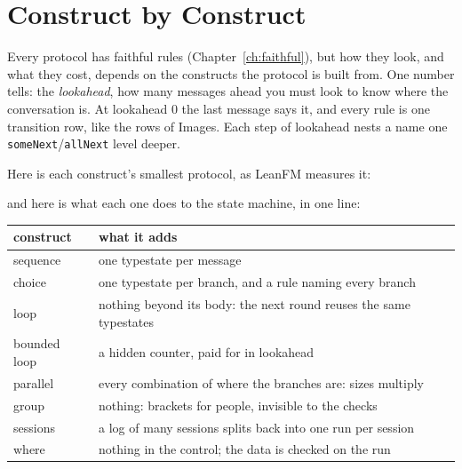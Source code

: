 \chapter{Construct by Construct}\label{ch:constructs}

Every protocol has faithful rules (Chapter~\ref{ch:faithful}), but how they look, and what
they cost, depends on the constructs the protocol is built from. One number tells: the
\emph{lookahead}, how many messages ahead you must look to know where the conversation is.
At lookahead $0$ the last message says it, and every rule is one transition row, like the
rows of Images. Each step of lookahead nests a name one \texttt{someNext}/\texttt{allNext}
level deeper.

Here is each construct's smallest protocol, as LeanFM measures it:

\begin{table}[ht]
\centering
{}
\caption{Each construct's smallest protocol: checker nodes (states before merging),
typestates, lookahead, and whether its typestates are deterministic
(Section~\ref{def:det}).}
\label{tab:constructs}
\end{table}

and here is what each one does to the state machine, in one line:

\begin{center}
\begin{tabular}{@{}lp{}@{}}
\toprule
construct & what it adds \\
\midrule
sequence & one typestate per message \\
choice & one typestate per branch, and a rule naming every branch \\
loop & nothing beyond its body: the next round reuses the same typestates \\
bounded loop & a hidden counter, paid for in lookahead \\
parallel & every combination of where the branches are: sizes multiply \\
group & nothing: brackets for people, invisible to the checks \\
sessions & a log of many sessions splits back into one run per session \\
where & nothing in the control; the data is checked on the run \\
\bottomrule
\end{tabular}
\end{center}

